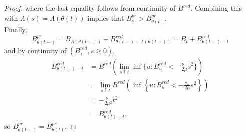 \begin{proof}
where the last equality follows from continuity of $B^{red}$. Combining this with $\Lambda(s)=\Lambda(\theta(t))$ implies that
$B^{pr}_s>B^{pr}_{\theta(t)}$. \\
Finally, 
$$B^{pr}_{\theta(t-)}=B_{\Lambda(\theta(t-))}+B^{red}_{\theta(t-)-\Lambda(\theta(t-))}
=B_{t}+B^{red}_{\theta(t-)-t}$$
and by continuity of $(B^{red}_s,s\geq 0)$,
\begin{align*}B^{red}_{\theta(t-)-t}&=B^{red}\left({\lim_{s\uparrow t}\inf\{u:B^{red}_u<-\frac{\nu_-}{2\mu} s^2\}}\right)\\&=\lim_{s\uparrow t} B^{red}\left({\inf\left\{u:B^{red}_u<-\frac{\nu_-}{2\mu} s^2\right\}}\right)\\&= -\frac{\nu_-}{2\mu^2}t^2\\
&=B^{red}_{\theta(t)-t}, \end{align*}
so 
$B^{pr}_{\theta(t-)}=B^{pr}_{\theta(t)}.$
\end{proof}